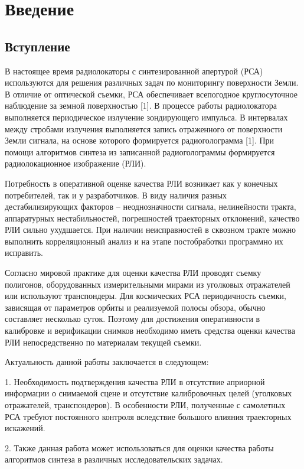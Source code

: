 \chapter{Введение}
\label{sec:Chapter0} 

\section{Вступление}

	В настоящее время радиолокаторы с синтезированной апертурой (РСА) используются для решения различных задач по мониторингу поверхности Земли. В отличие от оптической съемки, РСА обеспечивает всепогодное круглосуточное наблюдение за земной поверхностью [1]. В процессе работы радиолокатора выполняется периодическое излучение зондирующего импульса. В интервалах между стробами излучения выполняется запись отраженного от поверхности Земли сигнала, на основе которого формируется радиоголограмма [1]. При помощи алгоритмов синтеза из записанной радиоголограммы формируется радиолокационное изображение (РЛИ).

	Потребность в оперативной оценке качества РЛИ возникает как у конечных потребителей, так и у разработчиков. В виду наличия разных дестабилизирующих факторов – неоднозначности сигнала, нелинейности тракта, аппаратурных нестабильностей, погрешностей траекторных отклонений, качество РЛИ сильно ухудшается. При наличии неисправностей в сквозном тракте можно выполнить корреляционный анализ и на этапе постобработки программно их исправить.	
	
	Согласно мировой практике для оценки качества РЛИ проводят съемку полигонов, оборудованных измерительными мирами из уголковых отражателей или используют транспондеры. Для космических РСА периодичность съемки, зависящая от параметров орбиты и реализуемой полосы обзора, обычно составляет несколько суток. Поэтому для достижения оперативности в калибровке и верификации снимков необходимо иметь средства оценки качества РЛИ непосредственно по материалам текущей съемки.	
	
	Актуальность данной работы заключается в следующем:
	
	1. Необходимость подтверждения качества РЛИ в отсутствие априорной информации о снимаемой сцене и отсутствие калибровочных целей (уголковых отражателей, транспондеров). В особенности РЛИ, полученные с самолетных РСА требуют постоянного контроля вследствие большого влияния траекторных искажений.
	
	2. Также данная работа может использоваться для оценки качества работы алгоритмов синтеза в различных исследовательских задачах.
	
